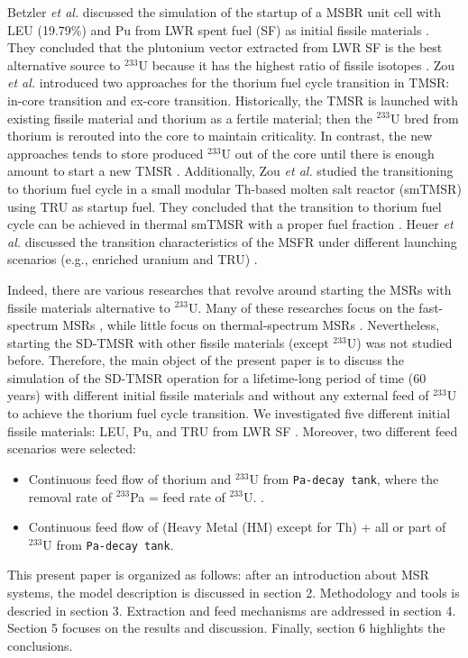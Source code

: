 Betzler \emph{et al.} discussed the simulation of the startup of a MSBR unit 
cell with \gls{LEU} (19.79\%) and Pu from \gls{LWR} spent fuel (SF) as initial 
fissile materials \cite{betzler2016modeling}. They concluded that the 
plutonium vector extracted from LWR SF is the best alternative source 
to $^{233}$U because it has the highest ratio of fissile isotopes 
\cite{betzler2016modeling}. Zou \emph{et al.} introduced two approaches for 
the thorium fuel cycle transition in \gls{TMSR}: in-core transition and 
ex-core transition. Historically, the TMSR is launched with existing fissile 
material and thorium as a fertile material; then the $^{233}$U bred from 
thorium is rerouted into the core to maintain criticality. In contrast, the 
new approaches tends to store produced $^{233}$U out of the core until there 
is enough amount to start a new TMSR \cite{zou2018transition}.
Additionally, Zou \emph{et al.} studied the transitioning to thorium fuel 
cycle in a small modular Th-based molten salt reactor (smTMSR) using \gls{TRU} 
as startup fuel. They concluded that the transition to thorium fuel cycle can 
be achieved in thermal smTMSR with a proper fuel fraction 
\cite{zou2018preliminary}.
Heuer \emph{et al.} discussed the transition characteristics of the \gls{MSFR} 
under different launching scenarios (e.g., enriched uranium and TRU) 
\cite{heuer2014towards}.

Indeed, there are various researches that revolve around starting the 
\glspl{MSR} with fissile materials alternative to $^{233}$U. Many of these 
researches focus on the fast-spectrum \glspl{MSR} \cite{ashraf2019modeling, 
ashraf2018nuclear, rykhlevskii_fuel_2019, betzler_impacts_2019, 
heuer2014towards,fiorina2013investigation}, while little focus on 
thermal-spectrum \glspl{MSR} \cite{betzler2016modeling, zou2018preliminary, 
zou2018transition}. Nevertheless, starting the \gls{SD-TMSR} with other 
fissile materials (except $^{233}$U) was not studied before. Therefore, 
the main object of the present paper is to discuss the simulation of the 
\gls{SD-TMSR} operation for a lifetime-long period of time (60 years) with 
different initial fissile materials and without any external feed of $^{233}$U 
to achieve the thorium fuel cycle transition. We investigated five different  
initial fissile materials: \gls{LEU}, Pu, and \gls{TRU} from LWR SF 
\cite{de2000scenarios}. Moreover, two different feed scenarios were selected:
\begin{itemize}
	\item Continuous feed flow of thorium and $^{233}$U from \texttt{Pa-decay tank}, where the removal rate of $^{233}$Pa = feed rate of $^{233}$U. \cite{betzler2016modeling}.
	\item Continuous feed flow of (Heavy Metal (HM) except for Th) + all or part of $^{233}$U from \texttt{Pa-decay tank}.
\end{itemize}
This present paper is organized as follows: after an introduction about \gls{MSR} systems, the model description is discussed in section 2. Methodology and tools is descried in section 3. Extraction and feed mechanisms are addressed in section 4. Section 5 focuses on the results and discussion. Finally, section 6 highlights the conclusions.

